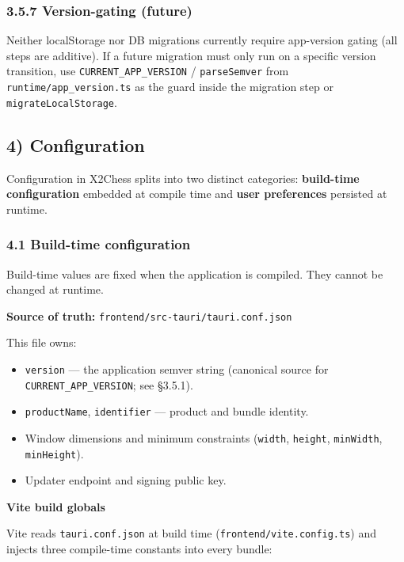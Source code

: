 \documentclass[]{article}
\providecommand{\tightlist}{%
  \setlength{\itemsep}{0pt}\setlength{\parskip}{0pt}}
\begin{document}
\subsubsection{3.5.7 Version-gating
(future)}\label{version-gating-future}

Neither localStorage nor DB migrations currently require app-version
gating (all steps are additive). If a future migration must only run on
a specific version transition, use \texttt{CURRENT\_APP\_VERSION} /
\texttt{parseSemver} from \texttt{runtime/app\_version.ts} as the guard
inside the migration step or \texttt{migrateLocalStorage}.

\subsection{4) Configuration}\label{configuration}

Configuration in X2Chess splits into two distinct categories:
\textbf{build-time configuration} embedded at compile time and
\textbf{user preferences} persisted at runtime.

\subsubsection{4.1 Build-time
configuration}\label{build-time-configuration}

Build-time values are fixed when the application is compiled. They
cannot be changed at runtime.

\textbf{Source of truth:} \texttt{frontend/src-tauri/tauri.conf.json}

This file owns:

\begin{itemize}
\tightlist
\item
  \texttt{version} --- the application semver string (canonical source
  for \texttt{CURRENT\_APP\_VERSION}; see §3.5.1).
\item
  \texttt{productName}, \texttt{identifier} --- product and bundle
  identity.
\item
  Window dimensions and minimum constraints (\texttt{width},
  \texttt{height}, \texttt{minWidth}, \texttt{minHeight}).
\item
  Updater endpoint and signing public key.
\end{itemize}

\textbf{Vite build globals}

Vite reads \texttt{tauri.conf.json} at build time
(\texttt{frontend/vite.config.ts}) and injects three compile-time
constants into every bundle:
\end{document}
